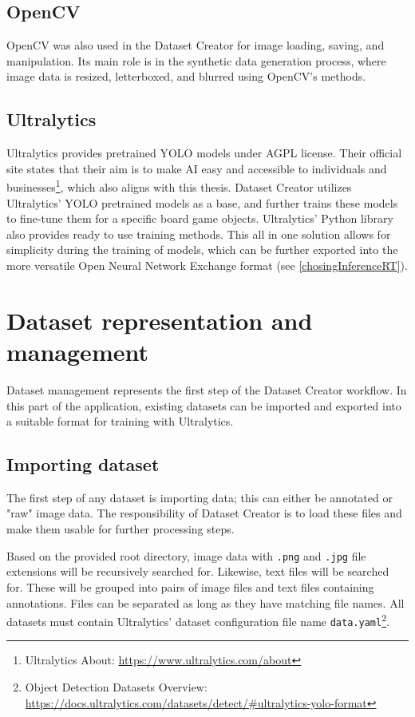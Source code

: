 \subsection{OpenCV}
OpenCV was also used in the Dataset Creator for image loading, saving, and manipulation. Its main role is in the synthetic data generation process, where image data is resized, letterboxed, and blurred using OpenCV's methods.

\subsection{Ultralytics}
\label{Ultralytics}
Ultralytics provides pretrained YOLO models under AGPL license. Their official site states that their aim is to make AI easy and accessible to individuals and businesses\footnote{Ultralytics About: \url{https://www.ultralytics.com/about}}, which also aligns with this thesis. Dataset Creator utilizes Ultralytics' YOLO pretrained models as a base, and further trains these models to fine-tune them for a specific board game objects. Ultralytics' Python library also provides ready to use training methods. This all in one solution allows for simplicity during the training of models, which can be further exported into the more versatile Open Neural Network Exchange format (see \ref{chosingInferenceRT}).




\section{Dataset representation and management}
Dataset management represents the first step of the Dataset Creator workflow. In this part of the application, existing datasets can be imported and exported into a suitable format for training with Ultralytics.

\subsection{Importing dataset}
The first step of any dataset is importing data; this can either be annotated or "raw" image data. The responsibility of Dataset Creator is to load these files and make them usable for further processing steps.

Based on the provided root directory, image data with \texttt{.png} and \texttt{.jpg} file extensions will be recursively searched for. Likewise, text files will be searched for. These will be grouped into pairs of image files and text files containing annotations. Files can be separated as long as they have matching file names. All datasets must contain Ultralytics' dataset configuration file name \texttt{data.yaml}\footnote{Object Detection Datasets Overview: \url{https://docs.ultralytics.com/datasets/detect/\#ultralytics-yolo-format}}. 

